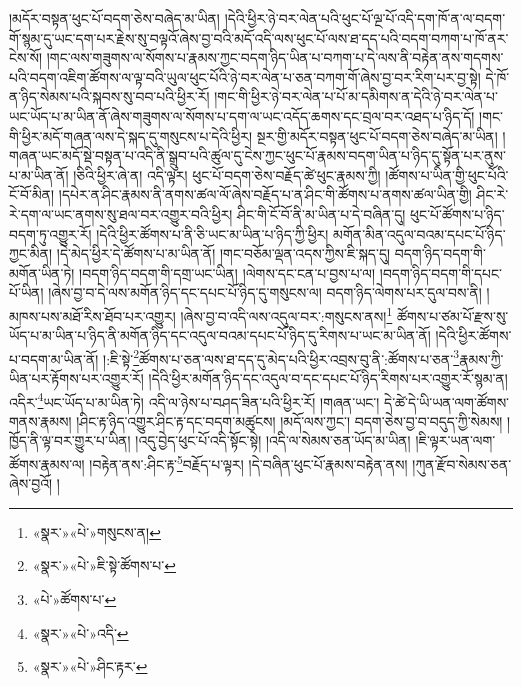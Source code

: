 །མདོར་བསྟན་ཕུང་པོ་བདག་ཅེས་བཞེད་མ་ཡིན། །དེའི་ཕྱིར་ཉེ་བར་ལེན་པའི་ཕུང་པོ་ལྔ་པོ་འདི་དག་ཁོ་ན་ལ་བདག་གོ་སྙམ་དུ་ཡང་དག་པར་རྗེས་སུ་བལྟའོ་ཞེས་བྱ་བའི་མདོ་འདི་ལས་ཕུང་པོ་ལས་ཐ་དད་པའི་བདག་བཀག་པ་ཁོ་ནར་ངེས་སོ། །གང་ལས་གཟུགས་ལ་སོགས་པ་རྣམས་ཀྱང་བདག་ཉིད་ཡིན་པ་བཀག་པ་དེ་ལས་ནི་བརྟེན་ནས་གདགས་པའི་བདག་འཇིག་ཚོགས་ལ་ལྟ་བའི་ཡུལ་ཕུང་པོའི་ཉེ་བར་ལེན་པ་ཅན་བཀག་གོ་ཞེས་བྱ་བར་རིག་པར་བྱ་སྟེ། དེ་ཁོ་ན་ཉིད་སེམས་པའི་སྐབས་སུ་བབ་པའི་ཕྱིར་རོ། །གང་གི་ཕྱིར་ཉེ་བར་ལེན་པ་པོ་མ་དམིགས་ན་དེའི་ཉེ་བར་ལེན་པ་ཡང་ཡོད་པ་མ་ཡིན་ནོ་ཞེས་གཟུགས་ལ་སོགས་པ་དག་ལ་ཡང་འདོད་ཆགས་དང་བྲལ་བར་འཐད་པ་ཉིད་དོ། །གང་གི་ཕྱིར་མདོ་གཞན་ལས་དེ་སྐད་དུ་གསུངས་པ་དེའི་ཕྱིར། སྔར་གྱི་མདོར་བསྟན་ཕུང་པོ་བདག་ཅེས་བཞེད་མ་ཡིན། །གཞན་ཡང་མདོ་སྡེ་བསྟན་པ་འདི་ནི་སྒྲུབ་པའི་ཚུལ་དུ་ངེས་ཀྱང་ཕུང་པོ་རྣམས་བདག་ཡིན་པ་ཉིད་དུ་སྟོན་པར་ནུས་པ་མ་ཡིན་ནོ། །ཅིའི་ཕྱིར་ཞེ་ན། འདི་ལྟར། ཕུང་པོ་བདག་ཅེས་བརྗོད་ཚེ་ཕུང་རྣམས་ཀྱི། །ཚོགས་པ་ཡིན་གྱི་ཕུང་པོའི་ངོ་བོ་མིན། །དཔེར་ན་ཤིང་རྣམས་ནི་ནགས་ཚལ་ལོ་ཞེས་བརྗོད་པ་ན་ཤིང་གི་ཚོགས་པ་ནགས་ཚལ་ཡིན་གྱི། ཤིང་རེ་རེ་དག་ལ་ཡང་ནགས་སུ་ཐལ་བར་འགྱུར་བའི་ཕྱིར། ཤིང་གི་ངོ་བོ་ནི་མ་ཡིན་པ་དེ་བཞིན་དུ། ཕུང་པོ་ཚོགས་པ་ཉིད་བདག་ཏུ་འགྱུར་རོ། །དེའི་ཕྱིར་ཚོགས་པ་ནི་ཅི་ཡང་མ་ཡིན་པ་ཉིད་ཀྱི་ཕྱིར། མགོན་མིན་འདུལ་བའམ་དཔང་པོ་ཉིད་ཀྱང་མིན། །དེ་མེད་ཕྱིར་དེ་ཚོགས་པ་མ་ཡིན་ནོ། །གང་བཅོམ་ལྡན་འདས་ཀྱིས་ཇི་སྐད་དུ། བདག་ཉིད་བདག་གི་མགོན་ཡིན་ཏེ། །བདག་ཉིད་བདག་གི་དགྲ་ཡང་ཡིན། །ལེགས་དང་ངན་པ་བྱས་པ་ལ། །བདག་ཉིད་བདག་གི་དཔང་པོ་ཡིན། །ཞེས་བྱ་བ་དེ་ལས་མགོན་ཉིད་དང་དཔང་པོ་ཉིད་དུ་གསུངས་ལ། བདག་ཉིད་ལེགས་པར་དུལ་བས་ནི། །མཁས་པས་མཐོ་རིས་ཐོབ་པར་འགྱུར། །ཞེས་བྱ་བ་འདི་ལས་འདུལ་བར་:གསུངས་ནས།\footnote{«སྣར་»«པེ་»གསུངས་ན།} ཚོགས་པ་ཙམ་པོ་རྫས་སུ་ཡོད་པ་མ་ཡིན་པ་ཉིད་ནི་མགོན་ཉིད་དང་འདུལ་བའམ་དཔང་པོ་ཉིད་དུ་རིགས་པ་ཡང་མ་ཡིན་ནོ། །དེའི་ཕྱིར་ཚོགས་པ་བདག་མ་ཡིན་ནོ། །:ཇི་སྟེ་\footnote{«སྣར་»«པེ་»ཇི་སྟེ་ཚོགས་པ་}ཚོགས་པ་ཅན་ལས་ཐ་དད་དུ་མེད་པའི་ཕྱིར་འབྲས་བུ་ནི་:ཚོགས་པ་ཅན་\footnote{«པེ་»ཚོགས་པ་}རྣམས་ཀྱི་ཡིན་པར་རྟོགས་པར་འགྱུར་རོ། །དེའི་ཕྱིར་མགོན་ཉིད་དང་འདུལ་བ་དང་དཔང་པོ་ཉིད་རིགས་པར་འགྱུར་རོ་སྙམ་ན། འདིར་\footnote{«སྣར་»«པེ་»འདི་}ཡང་ཡོད་པ་མ་ཡིན་ཏེ། འདི་ལ་ཉེས་པ་བཤད་ཟིན་པའི་ཕྱིར་རོ། །གཞན་ཡང་། དེ་ཚེ་དེ་ཡི་ཡན་ལག་ཚོགས་གནས་རྣམས། །ཤིང་རྟ་ཉིད་འགྱུར་ཤིང་རྟ་དང་བདག་མཚུངས། །མདོ་ལས་ཀྱང་། བདག་ཅེས་བྱ་བ་བདུད་ཀྱི་སེམས། །ཁྱོད་ནི་ལྟ་བར་གྱུར་པ་ཡིན། །འདུ་བྱེད་ཕུང་པོ་འདི་སྟོང་སྟེ། །འདི་ལ་སེམས་ཅན་ཡོད་མ་ཡིན། །ཇི་ལྟར་ཡན་ལག་ཚོགས་རྣམས་ལ། །བརྟེན་ནས་:ཤིང་རྟ་\footnote{«སྣར་»«པེ་»ཤིང་རྟར་}བརྗོད་པ་ལྟར། །དེ་བཞིན་ཕུང་པོ་རྣམས་བརྟེན་ནས། །ཀུན་རྫོབ་སེམས་ཅན་ཞེས་བྱའོ། །

